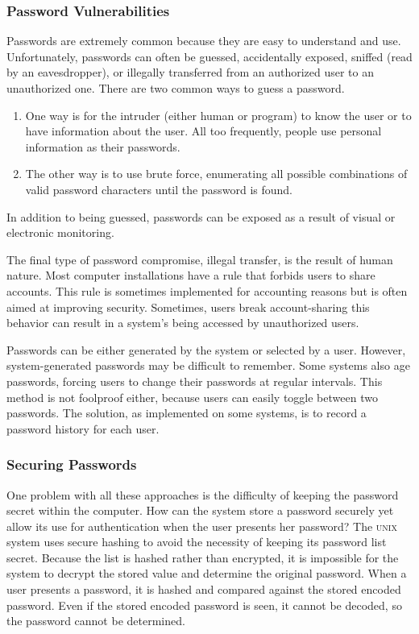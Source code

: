 \subsubsection{Password Vulnerabilities}\label{subsubsec:Password_Vulnerabilities}
Passwords are extremely common because they are easy to understand and use.
Unfortunately, passwords can often be guessed, accidentally exposed, sniffed (read by an eavesdropper), or illegally transferred from an authorized user to an unauthorized one.
There are two common ways to guess a password.
\begin{enumerate}[noitemsep]
\item One way is for the intruder (either human or program) to know the user or to have information about the user.
  All too frequently, people use personal information as their passwords.
\item The other way is to use brute force, enumerating all possible combinations of valid password characters until the password is found.
\end{enumerate}

In addition to being guessed, passwords can be exposed as a result of
visual or electronic monitoring.

The final type of password compromise, illegal transfer, is the result of human nature.
Most computer installations have a rule that forbids users to share accounts.
This rule is sometimes implemented for accounting reasons but is often aimed at improving security.
Sometimes, users break account-sharing this behavior can result in a system’s being accessed by unauthorized users.

Passwords can be either generated by the system or selected by a user.
However, system-generated passwords may be difficult to remember.
Some systems also age passwords, forcing users to change their passwords at regular intervals.
This method is not foolproof either, because users can easily toggle between two passwords.
The solution, as implemented on some systems, is to record a password history for each user.

\subsubsection{Securing Passwords}\label{subsubsec:Securing_Passwords}
One problem with all these approaches is the difficulty of keeping the password secret within the computer.
How can the system store a password securely yet allow its use for authentication when the user presents her password?
The \textsc{unix} system uses secure hashing to avoid the necessity of keeping its password list secret.
Because the list is hashed rather than encrypted, it is impossible for the system to decrypt the stored value and determine the original password.
When a user presents a password, it is hashed and compared against the stored encoded password.
Even if the stored encoded password is seen, it cannot be decoded, so the password cannot be determined.

